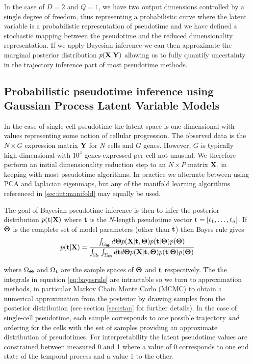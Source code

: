 In the case of $D = 2$ and $Q = 1$, we have two output dimensions controlled by a single degree of freedom, thus representing a probabilistic curve where the latent variable is a probabilistic representation of pseudotime and we have defined a stochastic mapping between the pseudotime and the reduced dimensionality representation. If we apply Bayesian inference we can then approximate the marginal posterior distribution $p({\bf X} | {\bf Y})$ allowing us to fully quantify uncertainty in the trajectory inference part of most pseudotime methods.


\subsection{Probabilistic pseudotime inference using Gaussian Process Latent Variable Models}

In the case of single-cell pseudotime the latent space is one dimensional with values representing some notion of cellular progression. The observed data is the $N \times G$ expression matrix $\mathbf{Y}$ for $N$ cells and $G$ genes. However, $G$ is typically high-dimensional with $10^4$ genes expressed per cell not unusual. We therefore perform an initial dimensionality reduction step to an $N \times P$ matrix $\mathbf{X}$, in keeping with most pseudotime algorithms. In practice we alternate between using PCA and laplacian eigenmaps, but any of the manifold learning algorithms referenced in \ref{sec:int:manifold} may equally be used.

The goal of Bayesian pseudotime inference is then to infer the posterior distribution $p(\mathbf{t}|\mathbf{X})$ where ${\bf t}$ is the $N$-length pseudotime vector ${\bf t} = [ t_1, \dots, t_n ]$. If $\bm{\Theta}$ is  the complete set of model parameters (other than $\mathbf{t}$) then Bayes rule gives
\begin{equation}
	p(\mathbf{t} | \mathbf{X}) = \frac{
\int_{\Omega_{\bm{\Theta}}} d\bm{\Theta} p(\mathbf{X} | \mathbf{t}, \bm{\Theta}) p(\mathbf{t} | \bm{\Theta}) p(\bm{\Theta})
	}{
\int_{\Omega_{\mathbf{t}}} \int_{\Sigma_{\bm{\Theta}}} d\mathbf{t} d\bm{\Theta} p(\mathbf{X} | \mathbf{t}, \bm{\Theta}) p(\mathbf{t} | \bm{\Theta}) p(\bm{\Theta})
	}
\end{equation} \label{eq:bayesrule}

where $\Omega_{\bm{\Theta}}$ and $\Omega_{\mathbf{t}}$ are the sample spaces of $\bm{\Theta}$ and $\mathbf{t}$ respectively. The the integrals in equation \ref{eq:bayesrule} are intractable so we turn to approximation methods, in particular Markov Chain Monte Carlo (MCMC) to obtain a numerical approximation from the posterior by drawing samples from the posterior distribution (see section \ref{sec:stan} for further details). In the case of single-cell pseudotime, each sample corresponds to one possible trajectory \emph{and} ordering for the cells with the set of samples providing an approximate distribution of pseudotimes. For interpretability the latent pseudotime values are constrained between measured 0 and 1 where a value of 0 corresponds to one end state of the temporal process and a value 1 to the other.

